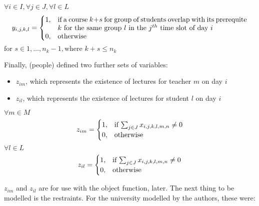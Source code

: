 \documentclass[a4paper, 12pt]{report}
\begin{document}
\begin{math}
	\forall i \in I, \forall j \in J, \forall l \in L
\end{math}
\begin{align*}
	y_{i,j,k,l} = 
	\begin{cases}
		1, & \parbox[t]{9.5cm}{if a course \( k + s \) for group of students
		overlap with its prerequite \( k \) for the same group \( l \) in the 
		\( j^{th} \) time slot of day \( i \)} \\
		0, & \text{otherwise}
	\end{cases}	
\end{align*}
\begin{math}
	\text{for } s \in 1, \ldots, n_k - 1, \text{where } k + s \leq n_k	
\end{math}

Finally, (people) defined two further sets of variables:
\begin{itemize}
	\item \( z_{im} \), which represents the existence of lectures for teacher 
		\( m \) on day \( i \)
	\item \( z_{il} \), which represents the existence of lectures for student 
		\( l \) on day \( i \)
\end{itemize}
\begin{math}
	\forall m \in M
\end{math}
\begin{align*}
	z_{im} =
	\begin{cases}
		1, & \text{if \( \sum_{j \in J} x_{i,j,k,l,m,n} \neq 0 \)} \\
		0, & \text{otherwise}
	\end{cases}	
\end{align*}
\begin{math}
	\forall l \in L
\end{math}
\begin{align*}
	z_{il} =
	\begin{cases}
		1, & \text{if \( \sum_{j \in J} x_{i,j,k,l,m,n} \neq 0 \)} \\
		0, & \text{otherwise}
	\end{cases}	
\end{align*}

\( z_{im} \) and \( z_{il} \) are for use with the object function, later. The
next thing to be modelled is the restraints.
For the university modelled by the authors, these were:
\end{document}
